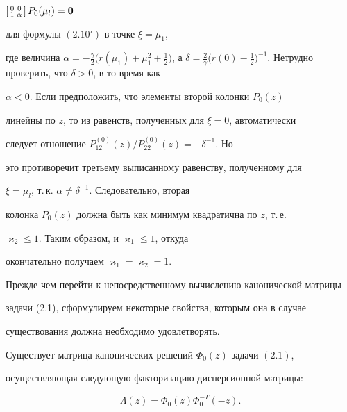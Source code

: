 \begin{pf}
$\left[\begin{smallmatrix} 0 & 0 \\ 1 & \alpha\end{smallmatrix}\right] 


P_0(\mu_l)=\bold 0$ 


для формулы $(2.10')$ в точке $\xi=\mu_1$, 


где величина $\alpha=-\frac{\gamma}{2}\big( r(\mu_1)+\mu^2_1+ 


\frac{1}{2}\big)$, а $\delta=\frac{2}{\gamma}\big( r(0)-\frac{1}{2} 


\big)^{-1}$. Нетрудно проверить, что $\delta>0$, в то время как 


$\alpha<0$. Если предположить, что элементы второй колонки $P_0(z)$ 


линейны по $z$, то из равенств, полученных для $\xi=0$, автоматически 


следует отношение $P^{(0)}_{12}(z)/P^{(0)}_{22}(z)=-\delta^{-1}$. Но 


это противоречит третьему выписанному равенству, полученному для 


$\xi=\mu_l$, т.\,к. $\alpha\ne\delta^{-1}$. Следовательно, вторая 


колонка $P_0(z)$ должна быть как минимум квадратична по $z$, т.\,е. 


$\varkappa_2\le1$. Таким образом, и $\varkappa_1\le1$, откуда 


окончательно получаем $\varkappa_1=\varkappa_2=1$. 


\end{pf} 


 


Прежде чем перейти к непосредственному вычислению канонической матрицы 


задачи (2.1), сформулируем некоторые свойства, которым она в случае 


существования должна необходимо удовлетворять. 


 


\begin{lem} 


Существует матрица канонических решений $\Phi_0(z)$ задачи $(2.1)$, 


осуществляющая следующую факторизацию дисперсионной матрицы\/${:}$ 


\begin{equation} 


\Lambda(z)=\Phi_0(z)\Phi^{-T}_0(-z). 


\end{equation} 


\end{lem} 


